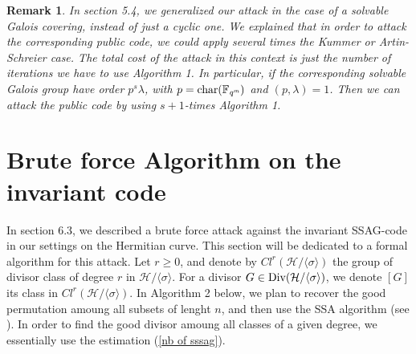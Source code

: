 \documentclass[10pt]{article}
\newtheorem{rq1}{Remark}[]
\newcommand{\s}{\vspace{0.3cm}}
\newcommand{\fqm}{\mathbb{F}_{q^m}}
\begin{document}
\s


\begin{rq1} \rm
In section 5.4, we generalized our attack in the case of a solvable Galois covering, instead of just a cyclic one. We explained that in order to attack the corresponding public code, we could apply several times the Kummer or Artin-Schreier case. The total cost of the attack in this context is just the number of iterations we have to use Algorithm 1. In particular, if the corresponding solvable Galois group have order $p^s\lambda$, with $p=\rm char \it (\fqm)$ and $(p,\lambda)=1$. Then we can attack the public code by using $s+1$-times Algorithm 1.
\end{rq1}

\newpage

\section{Brute force Algorithm on the invariant code}

\s

In section 6.3, we described a brute force attack against the invariant SSAG-code in our settings on the Hermitian curve. This section will be dedicated to a formal algorithm for this attack. 
Let $r \geq 0$, and denote by $Cl^r(\mathcal{H}/\langle \sigma \rangle)$ the group of divisor class of degree $r$ in $\mathcal{H}/\langle \sigma \rangle$. For a divisor $G \in \rm Div \it (\mathcal{H}/\langle \sigma \rangle)$, we denote $[G]$ its class in $Cl^r(\mathcal{H}/\langle \sigma \rangle)$. In Algorithm 2 below, we plan to recover the good permutation amoung all subsets of lenght $n$, and then use the SSA algorithm (see \cite{SSA}). In order to find the good divisor amoung all classes of a given degree, we essentially use the estimation (\ref{nb of sssag}).
\end{document}
